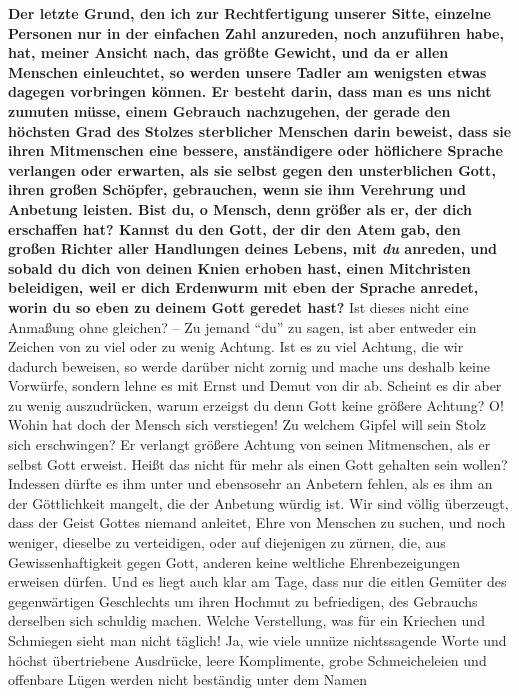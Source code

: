 \label{ref:10_08_duzen} \textbf{Der letzte Grund, den ich zur Rechtfertigung
unserer Sitte, einzelne Personen
nur in der einfachen Zahl anzureden, noch anzuführen habe, hat, meiner Ansicht
nach, das größte Gewicht, und da er allen Menschen einleuchtet, so werden unsere
Tadler am wenigsten etwas dagegen vorbringen können. Er besteht darin, dass man
es uns nicht zumuten müsse, einem Gebrauch nachzugehen, der gerade den
höchsten Grad des Stolzes sterblicher Menschen darin beweist, dass sie ihren
Mitmenschen eine bessere, anständigere oder höflichere Sprache verlangen oder
erwarten, als sie selbst gegen den unsterblichen Gott, ihren großen Schöpfer,
gebrauchen, wenn sie ihm Verehrung und Anbetung leisten.  Bist du, o Mensch, denn
größer als er, der dich erschaffen hat? Kannst du den Gott, der dir den Atem
gab, den großen Richter aller Handlungen deines Lebens, mit \textit{du}
anreden, und
sobald du dich von deinen Knien erhoben hast, einen Mitchristen beleidigen, weil
er dich Erdenwurm mit eben der Sprache anredet, worin du so
eben zu deinem Gott
geredet hast?} Ist dieses nicht eine Anmaßung ohne gleichen? -- Zu jemand "`du"'
zu
sagen, ist aber entweder ein Zeichen von zu viel oder zu wenig Achtung. Ist
es zu viel Achtung, die wir dadurch beweisen, so werde darüber nicht zornig und
mache uns deshalb keine Vorwürfe, sondern lehne es mit Ernst und Demut von
dir ab. Scheint es dir aber zu wenig auszudrücken, warum erzeigst du denn Gott
keine größere Achtung? O! Wohin hat doch der Mensch sich verstiegen! Zu welchem
Gipfel will sein Stolz sich erschwingen? Er verlangt größere Achtung von seinen
Mitmenschen, als er selbst Gott erweist. Heißt das nicht für mehr als einen
Gott gehalten sein wollen? Indessen dürfte es ihm unter und ebensosehr an
Anbetern fehlen, als es ihm an der Göttlichkeit mangelt, die der Anbetung würdig
ist. Wir sind völlig überzeugt, dass der Geist Gottes niemand anleitet, Ehre von
Menschen zu suchen, und noch weniger, dieselbe zu verteidigen, oder auf
diejenigen zu zürnen, die, aus Gewissenhaftigkeit gegen Gott, anderen keine
weltliche Ehrenbezeigungen erweisen dürfen. Und es liegt auch klar am Tage, dass
nur die eitlen Gemüter des gegenwärtigen Geschlechts um ihren Hochmut zu
befriedigen, des Gebrauchs derselben sich schuldig machen. Welche Verstellung,
was für ein Kriechen und Schmiegen sieht man nicht täglich! Ja,
wie viele
unnüze nichtssagende Worte und höchst übertriebene Ausdrücke, leere Komplimente,
grobe Schmeicheleien und offenbare Lügen werden nicht beständig unter dem Namen

